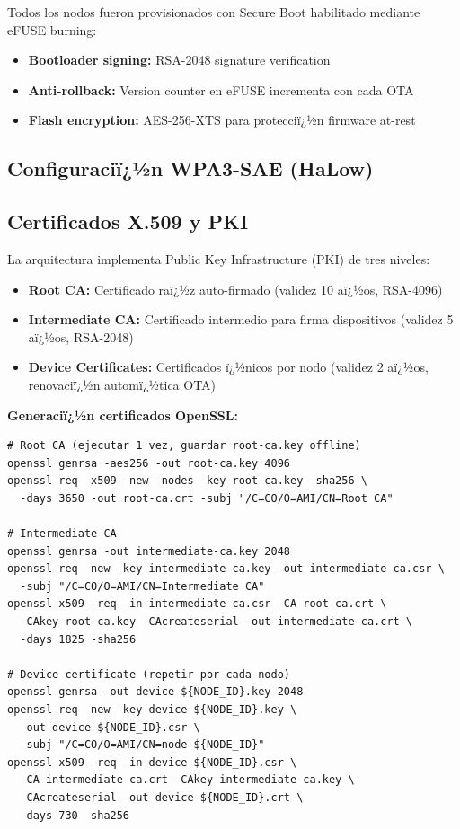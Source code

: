 Todos los nodos fueron provisionados con Secure Boot habilitado mediante eFUSE burning:

\begin{itemize}
    \item \textbf{Bootloader signing:} RSA-2048 signature verification
    \item \textbf{Anti-rollback:} Version counter en eFUSE incrementa con cada OTA
    \item \textbf{Flash encryption:} AES-256-XTS para protecciï¿½n firmware at-rest
\end{itemize}


\subsection{Configuraciï¿½n WPA3-SAE (HaLow)}


\subsection{Certificados X.509 y PKI}

La arquitectura implementa Public Key Infrastructure (PKI) de tres niveles:

\begin{itemize}
    \item \textbf{Root CA:} Certificado raï¿½z auto-firmado (validez 10 aï¿½os, RSA-4096)
    \item \textbf{Intermediate CA:} Certificado intermedio para firma dispositivos (validez 5 aï¿½os, RSA-2048)
    \item \textbf{Device Certificates:} Certificados ï¿½nicos por nodo (validez 2 aï¿½os, renovaciï¿½n automï¿½tica OTA)
\end{itemize}

\textbf{Generaciï¿½n certificados OpenSSL:}

\begin{verbatim}
# Root CA (ejecutar 1 vez, guardar root-ca.key offline)
openssl genrsa -aes256 -out root-ca.key 4096
openssl req -x509 -new -nodes -key root-ca.key -sha256 \
  -days 3650 -out root-ca.crt -subj "/C=CO/O=AMI/CN=Root CA"

# Intermediate CA
openssl genrsa -out intermediate-ca.key 2048
openssl req -new -key intermediate-ca.key -out intermediate-ca.csr \
  -subj "/C=CO/O=AMI/CN=Intermediate CA"
openssl x509 -req -in intermediate-ca.csr -CA root-ca.crt \
  -CAkey root-ca.key -CAcreateserial -out intermediate-ca.crt \
  -days 1825 -sha256

# Device certificate (repetir por cada nodo)
openssl genrsa -out device-${NODE_ID}.key 2048
openssl req -new -key device-${NODE_ID}.key \
  -out device-${NODE_ID}.csr \
  -subj "/C=CO/O=AMI/CN=node-${NODE_ID}"
openssl x509 -req -in device-${NODE_ID}.csr \
  -CA intermediate-ca.crt -CAkey intermediate-ca.key \
  -CAcreateserial -out device-${NODE_ID}.crt \
  -days 730 -sha256
\end{verbatim}

